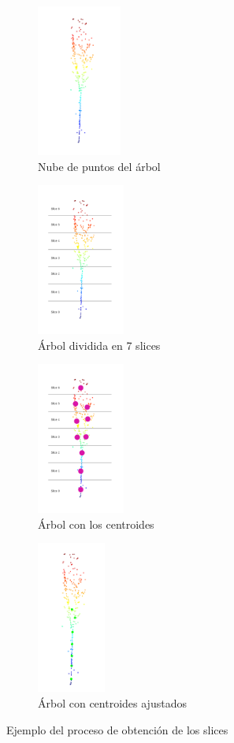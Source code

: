\begin{figure}
\centering
\begin{subfigure}[t]{.5\textwidth}
  \centering
  \includegraphics[height=5cm]{imaxes/tree.png}
  \caption{Nube de puntos del árbol}
  \label{fig:tree}
\end{subfigure}%
\begin{subfigure}[t]{.5\textwidth}
  \centering
  \includegraphics[height=5cm]{imaxes/tree_slices.png}
  \caption{Árbol dividida en 7 slices}
  \label{fig:tree_sliced}
\end{subfigure}

\begin{subfigure}[t]{.5\textwidth}
  \centering
  \includegraphics[height=5cm]{imaxes/tree_slices_centroids.png}
  \caption{Árbol con los centroides }
  \label{fig:tree_sliced_centroids}
\end{subfigure}%
\begin{subfigure}[t]{.5\textwidth}
  \centering
  \includegraphics[height=5cm]{imaxes/tree_centroides.png}
  \caption{Árbol con centroides ajustados}
  \label{fig:tree_sliced_res}
\end{subfigure}

\caption{Ejemplo del proceso de obtención de los slices}
\label{fig:ejemplotree}
\end{figure}




